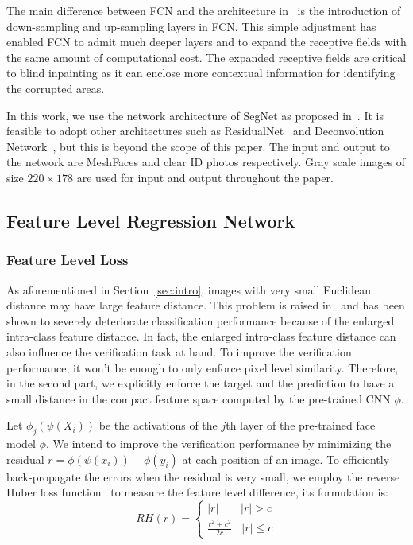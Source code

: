 \documentclass[10pt,twocolumn,letterpaper]{article}
\begin{document}
The main difference between FCN and the architecture in~\cite{7550058} is the introduction of down-sampling and up-sampling layers in FCN. This simple adjustment has enabled FCN to admit much deeper layers and to expand the receptive fields with the same amount of computational cost. The expanded receptive fields are critical to blind inpainting as it can enclose more contextual information for identifying the corrupted areas.


In this work, we use the network architecture of SegNet as proposed in~\cite{badrinarayanan2015segnet}.
 It is feasible to adopt other architectures such as ResidualNet~\cite{He_2016_CVPR} and Deconvolution Network~\cite{Noh_2015_ICCV}, but this is beyond the scope of this paper. The input and output to the network are MeshFaces and clear ID photos respectively. Gray scale images of size $220 \times 178$ are used for input and output throughout the paper.






\subsection{Feature Level Regression Network}
\subsubsection{Feature Level Loss} As aforementioned in Section~\ref{sec:intro}, images with very small Euclidean distance may have large feature distance. This problem is raised in~\cite{szegedy2013intriguing} and has been shown to severely deteriorate classification performance because of the enlarged intra-class feature distance. In fact, the enlarged intra-class feature distance can also influence the verification task at hand. To improve the verification performance, it won't be enough to only enforce pixel level similarity. %
Therefore, in the second part, we explicitly enforce the target and the prediction to have a small distance in the compact feature space computed by the pre-trained CNN $\phi$.

Let $\phi _j(\psi(X_i))$ be the activations of the $j$th layer of the pre-trained face model $\phi$. We intend to improve the verification performance by minimizing the residual $r = {\phi (\psi ({x_i})) - \phi ({y_i})}$ at each position of an image. To efficiently back-propagate the errors when the residual is very small, we employ the reverse Huber loss function~\cite{laina2016deeper} to measure the feature level difference, its formulation is:
\begin{equation}
RH(r) = \left\{ \begin{array}{l}
\left| r \right| \ \ \ \ \ \ \ \ \  \left| r \right| > c\\
\frac{{r^2 + c^2}}{{2c}}  \ \ \ \ \left| r \right| \le c
\end{array} \right.
\end{equation}
\end{document}
